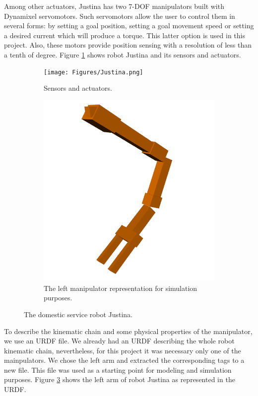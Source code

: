 \documentclass[a4paper, 10pt]{article}
\begin{document}
Among other actuators, Justina has two 7-DOF manipulators built with Dynamixel servomotors. Such servomotors allow the user to control them in several forms: by setting a goal position, setting a goal movement speed or setting a desired current which will produce a torque. This latter option is used in this project. Also, these motors provide position sensing with a resolution of less than a tenth of degree. Figure \ref{fig:Justina} shows robot Justina and its sensors and actuators. 
\begin{figure}
  \centering
  \begin{subfigure}[b]{0.4\textwidth}
    \centering
    \texttt{[image: Figures/Justina.png]}
    \caption{Sensors and actuators.}
    \label{fig:Justina}
  \end{subfigure}
  \hfill
  \begin{subfigure}[b]{0.45\textwidth}
    \centering
    \includegraphics[width=\textwidth]{Figures/left_arm.png}
    \caption{The left manipulator representation for simulation purposes.}
    \label{fig:left_arm}
  \end{subfigure}
  \caption{The domestic service robot Justina.}
\end{figure}

To describe the kinematic chain and some physical properties of the manipulator, we use an URDF file. We already had an URDF describing the whole robot kinematic chain, nevertheless, for this project it was necessary only one of the mainpulators. We chose the left arm and extracted the corresponding tags to a new file. This file was used as a starting point for modeling and simulation purposes. Figure \ref{fig:left_arm} shows the left arm of robot Justina as represented in the URDF.
\end{document}
